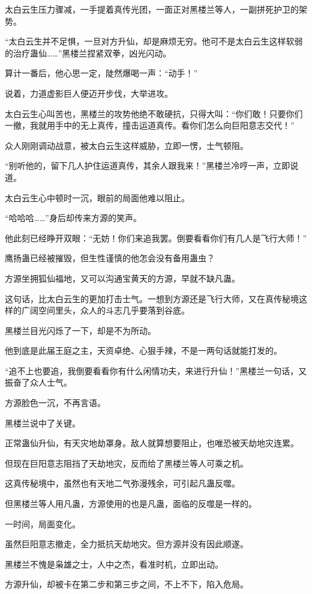 \begin{this_body}
太白云生压力骤减，一手提着真传光团，一面正对黑楼兰等人，一副拼死护卫的架势。

“太白云生并不足惧，一旦对方升仙，却是麻烦无穷。他可不是太白云生这样软弱的治疗蛊仙……”黑楼兰捏紧双拳，凶光闪动。

算计一番后，他心思一定，陡然爆喝一声：“动手！”

说着，力道虚影巨人便迈开步伐，大举进攻。

太白云生心叫苦也，黑楼兰的攻势他绝不敢硬抗，只得大叫：“你们敢！只要你们一撤，我就用手中的无上真传，撞击运道真传。看你们怎么向巨阳意志交代！”

众人刚刚调动战意，被太白云生这样威胁，立即一愣，士气顿阻。

“别听他的，留下几人护住运道真传，其余人跟我来！”黑楼兰冷哼一声，立即说道。

太白云生心中顿时一沉，眼前的局面他难以阻止。

“哈哈哈……”身后却传来方源的笑声。

他此刻已经睁开双眼：“无妨！你们来追我罢。倒要看看你们有几人是飞行大师！”

鹰扬蛊已经被摧毁，但生性谨慎的他怎会没有备用蛊虫？

方源坐拥狐仙福地，又可以沟通宝黄天的方源，早就不缺凡蛊。

这句话，比太白云生的更加打击士气。一想到方源还是飞行大师，又在真传秘境这样的广阔空间里头，众人的斗志几乎要落到谷底。

黑楼兰目光闪烁了一下，却是不为所动。

他到底是此届王庭之主，天资卓绝、心狠手辣，不是一两句话就能打发的。

“追不上也要追，我倒要看看你有什么闲情功夫，来进行升仙！”黑楼兰一句话，又振奋了众人士气。

方源脸色一沉，不再言语。

黑楼兰说中了关键。

正常蛊仙升仙，有天灾地劫罩身。敌人就算想要阻止，也唯恐被天劫地灾连累。

但现在巨阳意志阻挡了天劫地灾，反而给了黑楼兰等人可乘之机。

这真传秘境中，虽然也有天地二气弥漫残余，可引起凡蛊反噬。

但黑楼兰等人用凡蛊，方源使用的也是凡蛊，面临的反噬是一样的。

一时间，局面变化。

虽然巨阳意志撤走，全力抵抗天劫地灾。但方源并没有因此顺遂。

黑楼兰不愧是枭雄之士，人中之杰，看准时机，立即出动。

方源升仙，却被卡在第二步和第三步之间，不上不下，陷入危局。

\end{this_body}


